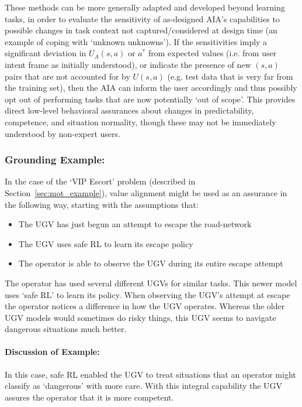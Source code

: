 These methods can be more generally adapted and developed beyond learning tasks, in order to evaluate the sensitivity of as-designed AIA's capabilities to possible changes in task context not captured/considered at design time (an example of coping with `unknown unknowns').  %
If the sensitivities imply a significant deviation in $U_A(s,a)$ or $a^*$ from expected values (i.e. from user intent frame as initially understood), or indicate the presence of new $(s,a)$ pairs that are not accounted for by $U(s,a)$ (e.g. test data that is very far from the training set), then the AIA can inform the user accordingly and thus possibly opt out of performing tasks that are now potentially `out of scope'. This provides direct low-level behavioral assurances about changes in predictability, competence, and situation normality, though these may not be immediately understood by non-expert users. %


\subsubsection{Grounding Example:}
In the case of the `VIP Escort' problem (described in Section~\ref{sec:mot_example}), value alignment might be used as an assurance in the following way, starting with the assumptions that:

\begin{itemize}
    \item The UGV has just begun an attempt to escape the road-network
    \item The UGV uses safe RL to learn its escape policy
    \item The operator is able to observe the UGV during its entire escape attempt
\end{itemize}

The operator has used several different UGVs for similar tasks. This newer model uses `safe RL' to learn its policy. When observing the UGV's attempt at escape the operator notices a difference in how the UGV operates. Whereas the older UGV models would sometimes do risky things, this UGV seems to navigate dangerous situations much better. 

\paragraph{\textbf{Discussion of Example:}} In this case, safe RL enabled the UGV to treat situations that an operator might classify as `dangerous' with more care. With this integral capability the UGV assures the operator that it is more competent.
